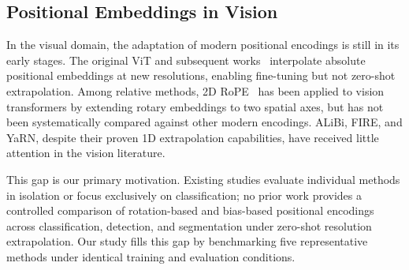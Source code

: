 \subsection{Positional Embeddings in Vision}

In the visual domain, the adaptation of modern positional encodings is still in its early stages. The original ViT and subsequent works~\cite{dosovitskiy2021image,beyer2022better} interpolate absolute positional embeddings at new resolutions, enabling fine-tuning but not zero-shot extrapolation. Among relative methods, 2D RoPE~\cite{heo2024rope} has been applied to vision transformers by extending rotary embeddings to two spatial axes, but has not been systematically compared against other modern encodings. ALiBi, FIRE, and YaRN, despite their proven 1D extrapolation capabilities, have received little attention in the vision literature.

This gap is our primary motivation. Existing studies evaluate individual methods in isolation or focus exclusively on classification; no prior work provides a controlled comparison of rotation-based and bias-based positional encodings across classification, detection, and segmentation under zero-shot resolution extrapolation. Our study fills this gap by benchmarking five representative methods under identical training and evaluation conditions.
